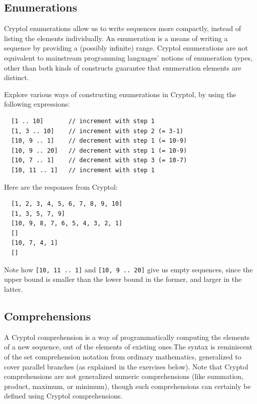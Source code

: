 \subsection{Enumerations}\indEnum
\label{sec:enumerations}

Cryptol enumerations allow us to write sequences more compactly,
instead of listing the elements individually.  An enumeration is a
means of writing a sequence by providing a (possibly infinite) range.
Cryptol enumerations are not equivalent to mainstream programming
languages' notions of enumeration types, other than both kinds of
constructs guarantee that enumeration elements are distinct.

\begin{Exercise}\label{ex:seq:3}
  Explore various ways of constructing enumerations in Cryptol, by
  using the following expressions:
\begin{Verbatim}
  [1 .. 10]       // increment with step 1
  [1, 3 .. 10]    // increment with step 2 (= 3-1)
  [10, 9 .. 1]    // decrement with step 1 (= 10-9)
  [10, 9 .. 20]   // decrement with step 1 (= 10-9)
  [10, 7 .. 1]    // decrement with step 3 (= 10-7)
  [10, 11 .. 1]   // increment with step 1
\end{Verbatim}
\end{Exercise}
\begin{Answer}
Here are the responses from Cryptol:
\begin{Verbatim}
  [1, 2, 3, 4, 5, 6, 7, 8, 9, 10]
  [1, 3, 5, 7, 9]
  [10, 9, 8, 7, 6, 5, 4, 3, 2, 1]
  []
  [10, 7, 4, 1]
  []
\end{Verbatim}
Note how \texttt{[10, 11 ..\ 1]} and \texttt{[10, 9 ..\ 20]} give us empty
sequences, since the upper bound is smaller than the lower bound in
the former, and larger in the latter.
\end{Answer}

\subsection{Comprehensions}\indComp
\label{sec:comprehensions}

A Cryptol comprehension is a way of programmatically computing the
elements of a new sequence, out of the elements of existing
ones.\indComp  The syntax is reminiscent of the set comprehension
notation from ordinary mathematics, generalized to cover parallel
branches (as explained in the exercises below).  Note that Cryptol
comprehensions are not generalized numeric comprehensions (like
summation, product, maximum, or minimum), though such comprehensions
can certainly be defined using Cryptol comprehensions.

